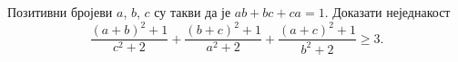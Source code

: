 \problem
Позитивни бројеви $a$, $b$, $c$ су такви да је $a b + b c + c a = 1$.
Доказати неједнакост
\[
    \frac{(a + b)^2 + 1}{c^2 + 2}
    +
    \frac{(b + c)^2 + 1}{a^2 + 2}
    +
    \frac{(a + c)^2 + 1}{b^2 + 2}
\geq
    3
.\]

\solution

\endproblem
